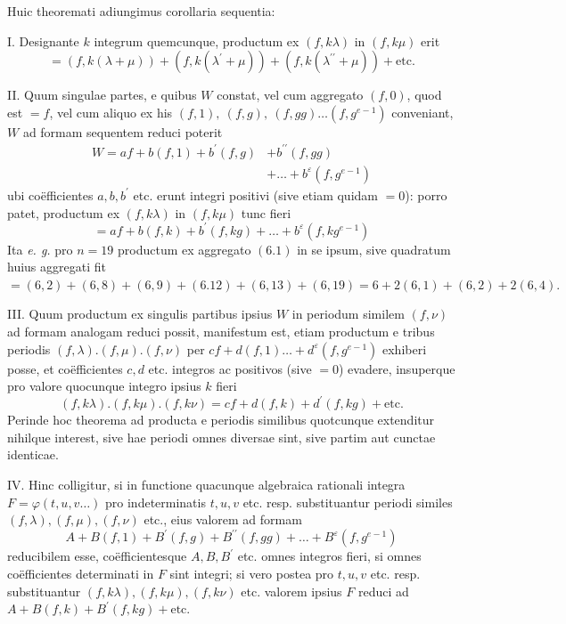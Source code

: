 Huic theoremati adiungimus corollaria sequentia:

I. Designante \(k\) integrum quemcunque, productum ex \((f,\allowbreak k\lambda)\) in \((f,\allowbreak k\mu)\) erit \[=(f,k(\lambda+\mu))+(f,k(\lambda^{\prime}+\mu))+(f,k(\lambda^{\prime\prime}+\mu))+\text{etc.}\]

II. Quum singulae partes, e quibus \(W\) constat, vel cum aggregato \((f,\allowbreak 0)\), quod est \(=f\), vel cum aliquo ex his \((f,\allowbreak 1),\allowbreak \ (f,\allowbreak g),\allowbreak \ (f,\allowbreak gg)\ldots(f,\allowbreak g^{e-1})\) conveniant, \(W\) ad formam sequentem reduci poterit \[\begin{aligned}
W=af+b(f,1)+b^{\prime}(f,g)&+b^{\prime\prime}(f,gg)\\
&+\ldots+b^\varepsilon(f,g^{e-1})
\end{aligned}\] ubi coëfficientes \(a,\allowbreak b,\allowbreak b^{\prime}\) etc. erunt integri positivi (sive etiam quidam \(=0\)): porro patet, productum ex \((f,\allowbreak k\lambda)\) in \((f,\allowbreak k\mu)\) tunc fieri \[=af+b(f,k)+b^{\prime}(f,kg)+\ldots+b^\varepsilon(f,kg^{e-1})\] Ita \textit{e. g.} pro \(n=19\) productum ex aggregato \((6.1)\) in se ipsum, sive quadratum huius aggregati fit \(=(6,\allowbreak 2)+(6,\allowbreak 8)+(6,\allowbreak 9)+(6.12)+(6,\allowbreak 13)+(6,\allowbreak 19)=6+2(6,\allowbreak 1)+(6,\allowbreak 2)+2(6,\allowbreak 4).\)

III. Quum productum ex singulis partibus ipsius \(W\) in periodum similem \((f,\allowbreak \nu)\) ad formam analogam reduci possit, manifestum est, etiam productum e tribus periodis \((f,\allowbreak \lambda).(f,\allowbreak \mu).(f,\allowbreak \nu)\) per \(cf+d(f,\allowbreak 1)\ldots+d^\varepsilon(f,\allowbreak g^{e-1})\) exhiberi posse, et coëfficientes \(c,\allowbreak d\) etc. integros ac positivos (sive \(=0\)) evadere, insuperque pro valore quocunque integro ipsius \(k\) fieri \[(f,k\lambda).(f,k\mu).(f,k\nu)=cf+d(f,k)+d^{\prime}(f,kg)+\text{etc.}\] Perinde hoc theorema ad producta e periodis similibus quotcunque extenditur nihilque interest, sive hae periodi omnes diversae sint, sive partim aut cunctae identicae.

IV. Hinc colligitur, si in functione quacunque algebraica rationali integra \(F=\varphi(t,\allowbreak u,\allowbreak v\ldots)\) pro indeterminatis \(t,\allowbreak u,\allowbreak v\) etc. resp. substituantur periodi similes \((f,\allowbreak \lambda),\allowbreak (f,\allowbreak \mu),\allowbreak (f,\allowbreak \nu)\) etc., eius valorem ad formam \[A+B(f,1)+B^{\prime}(f,g)+B^{\prime\prime}(f,gg)+\ldots+B^\varepsilon(f,g^{e-1})\] reducibilem esse, coëfficientesque \(A,\allowbreak B,\allowbreak B^{\prime}\) etc. omnes integros fieri, si omnes coëfficientes determinati in \(F\) sint integri; si vero postea pro \(t,\allowbreak u,\allowbreak v\) etc. resp.
substituantur \((f,\allowbreak k\lambda),\allowbreak (f,\allowbreak k\mu),\allowbreak (f,\allowbreak k\nu)\) etc. valorem ipsius \(F\) reduci ad \(A+B(f,\allowbreak k)+B^{\prime}(f,\allowbreak kg)+\text{etc.}\)

